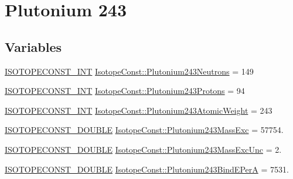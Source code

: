 \hypertarget{group___isotope_const-_plutonium-_pu243}{}\section{Plutonium 243}
\label{group___isotope_const-_plutonium-_pu243}
\subsection*{Variables}
\begin{DoxyCompactItemize}
\item 
\mbox{\hyperlink{group___isotope_const-_macros_ga5f18360b3e99483a35c32d789e62621c}{I\+S\+O\+T\+O\+P\+E\+C\+O\+N\+S\+T\+\_\+\+I\+NT}} \mbox{\hyperlink{group___isotope_const-_plutonium-_pu243_ga27e0c6fa18b4c6570c25a8b130860df4}{Isotope\+Const\+::\+Plutonium243\+Neutrons}} = 149
\item 
\mbox{\hyperlink{group___isotope_const-_macros_ga5f18360b3e99483a35c32d789e62621c}{I\+S\+O\+T\+O\+P\+E\+C\+O\+N\+S\+T\+\_\+\+I\+NT}} \mbox{\hyperlink{group___isotope_const-_plutonium-_pu243_gafa2868ce0f0487d255ef51e43454e8db}{Isotope\+Const\+::\+Plutonium243\+Protons}} = 94
\item 
\mbox{\hyperlink{group___isotope_const-_macros_ga5f18360b3e99483a35c32d789e62621c}{I\+S\+O\+T\+O\+P\+E\+C\+O\+N\+S\+T\+\_\+\+I\+NT}} \mbox{\hyperlink{group___isotope_const-_plutonium-_pu243_gaa9cd521aaee7d07f8cba063a0d2d5406}{Isotope\+Const\+::\+Plutonium243\+Atomic\+Weight}} = 243
\item 
\mbox{\hyperlink{group___isotope_const-_macros_ga8f45a7272ce02c0b4c65c44636ed719a}{I\+S\+O\+T\+O\+P\+E\+C\+O\+N\+S\+T\+\_\+\+D\+O\+U\+B\+LE}} \mbox{\hyperlink{group___isotope_const-_plutonium-_pu243_ga8770b5c334800968c2feb2391f668c1a}{Isotope\+Const\+::\+Plutonium243\+Mass\+Exc}} = 57754.
\item 
\mbox{\hyperlink{group___isotope_const-_macros_ga8f45a7272ce02c0b4c65c44636ed719a}{I\+S\+O\+T\+O\+P\+E\+C\+O\+N\+S\+T\+\_\+\+D\+O\+U\+B\+LE}} \mbox{\hyperlink{group___isotope_const-_plutonium-_pu243_gaaf2b320b40b521e5991ac7c26c03408c}{Isotope\+Const\+::\+Plutonium243\+Mass\+Exc\+Unc}} = 2.
\item 
\mbox{\hyperlink{group___isotope_const-_macros_ga8f45a7272ce02c0b4c65c44636ed719a}{I\+S\+O\+T\+O\+P\+E\+C\+O\+N\+S\+T\+\_\+\+D\+O\+U\+B\+LE}} \mbox{\hyperlink{group___isotope_const-_plutonium-_pu243_ga392855be7cf6af2db4aae2f590877846}{Isotope\+Const\+::\+Plutonium243\+Bind\+E\+PerA}} = 7531.
\item 

\end{DoxyCompactItemize}
